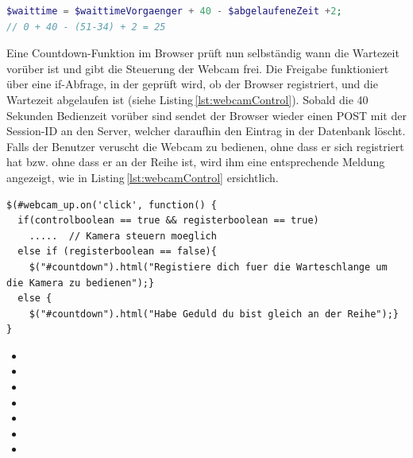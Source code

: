 \vspace{3mm}
\begin{lstlisting}[label=lst:wartezeit,caption=Berechnung der Wartezeit, language=PHP, style=PHP]
$waittime = $waittimeVorgaenger + 40 - $abgelaufeneZeit +2;
// 0 + 40 - (51-34) + 2 = 25
\end{lstlisting}
\vspace{3mm}

\noindent
Eine Countdown-Funktion im Browser prüft nun selbständig wann die Wartezeit vorüber ist und gibt die Steuerung der Webcam frei. Die Freigabe funktioniert über eine if-Abfrage, in der geprüft wird, ob der Browser registriert, und die Wartezeit abgelaufen ist (siehe Listing\,\ref{lst:webcamControl}).
Sobald die 40\,Sekunden Bedienzeit vorüber sind sendet der Browser wieder einen POST mit der Session-ID an den Server, welcher daraufhin den Eintrag in der Datenbank löscht. Falls der Benutzer veruscht die Webcam zu bedienen, ohne dass er sich registriert hat bzw. ohne dass er an der Reihe ist, wird ihm eine entsprechende Meldung angezeigt, wie in Listing\,\ref{lst:webcamControl} ersichtlich.

\vspace{3mm}
\begin{lstlisting}[label=lst:webcamControl, caption=Freigabe der Webcam-Steuerung,language=HTML5, style=htmlcssjs]
$(#webcam_up.on('click', function() {
  if(controlboolean == true && registerboolean == true)
    .....  // Kamera steuern moeglich
  else if (registerboolean == false){
    $("#countdown").html("Registiere dich fuer die Warteschlange um die Kamera zu bedienen");}
  else {
    $("#countdown").html("Habe Geduld du bist gleich an der Reihe");}
}
\end{lstlisting}
\vspace{3mm}


\begin{itemize}
\item {}
\item {}
\item {}
\item {}
\item {}
\item {}
\item {}
\end{itemize}
